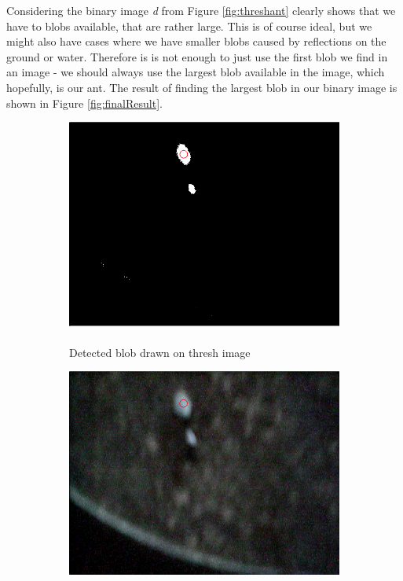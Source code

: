 Considering the binary image \emph{d} from Figure \ref{fig:threshant} clearly shows that we have to blobs available, that are rather large. This is of course ideal, but we might also have cases where we have smaller blobs caused by reflections on the ground or water. Therefore is is not enough to just use the first blob we find in an image - we should always use the largest blob available in the image, which hopefully, is our ant. The result of finding the largest blob in our binary image is shown in Figure \ref{fig:finalResult}.

\begin{figure}
    \captionsetup{justification=centering}
        \centering
        \begin{subfigure}[b]{0.45\textwidth}
                \includegraphics[scale = 0.25]{img/threshblob}
                \caption{\mbox{}\\Detected blob drawn on thresh image}
        \end{subfigure}
		\quad
        \centering
        \begin{subfigure}[b]{0.45\textwidth}
                \includegraphics[scale = 0.25]{img/srcblob}

\end{subfigure}
\end{figure}
